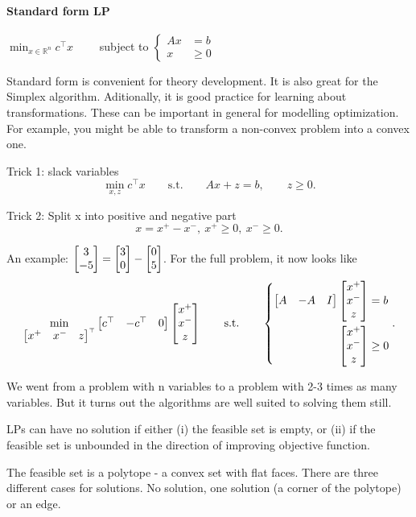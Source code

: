 \documentclass{article}
\begin{document}
\paragraph{Standard form LP} $\min_{x\in \mathbb{R}^{n}} c^{\top}x \qquad$ subject to $
  \left\{
  \begin{aligned}
    Ax & = b    \\
    x  & \geq 0
  \end{aligned}
  \right.$


\medskip Standard form is convenient for theory development. It is also great for the Simplex algorithm. Aditionally, it
is good practice for learning about transformations. These can be important in general for modelling optimization. For example, you
might be able to transform a non-convex problem into a convex one.

\medskip Trick 1: slack variables
\[
  \min_{x,z} c^{\top}x \qquad \text{s.t.} \qquad Ax + z = b, \qquad z \geq 0
  .\]

Trick 2: Split x into positive and negative part
\[
  x = x^{+} - x^{-},\ x^{+} \geq 0,\ x^{-} \geq 0
  .\]

An example: $\begin{bmatrix} 3 \\ -5 \end{bmatrix} = \begin{bmatrix} 3 \\ 0 \end{bmatrix} - \begin{bmatrix} 0 \\ 5 \end{bmatrix}$. For the full problem, it now looks like
\[
  \min_{\begin{bmatrix} x^{+} & x^{-} & z \end{bmatrix}^{\top}} \begin{bmatrix} c^{\top} & -c^{\top} & 0 \end{bmatrix}\begin{bmatrix} x^{+} \\ x^{-} \\ z \end{bmatrix} \qquad \text{s.t.}\qquad
  \left\{
  \begin{aligned}
    \begin{bmatrix} A & -A & I \end{bmatrix}\begin{bmatrix} x^{+} \\ x^{-} \\ z \end{bmatrix} &= b \\
    \begin{bmatrix} x^{+}               \\ x^{-} \\ z \end{bmatrix} &\geq 0
  \end{aligned}
  \right.
  .\]

We went from a problem with n variables to a problem with 2-3 times as many variables. But it turns out the
algorithms are well suited to solving them still.

\medskip
LPs can have no solution if either (i) the feasible set is empty, or (ii) if the feasible set is unbounded
in the direction of improving objective function.

\medskip The feasible set is a polytope - a convex set with flat faces. There are three different cases for solutions. No solution, one solution (a corner of the polytope) or an edge.
\end{document}
